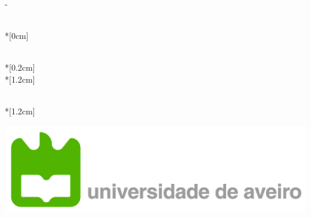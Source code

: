 \thispagestyle{empty}
\calccentering{\unitlength}
\begin{adjustwidth*}{\unitlength}{-\unitlength}
    \begin{adjustwidth}{-0.5cm}{-0.5cm}
        \sffamily
        \begin{flushright}
            \thesistypeabbr{} \\*[0cm]
            \thesistype{}\\
        \end{flushright}
        \vspace*{\fill}
        \noindent
        \HUGE \thesistitle{}\\*[0.2cm]
        \Huge \thesissubtitle{}\\*[1.2cm]
        \parbox[b]{0.5\linewidth}{
            \LARGE 
            \thesisauthor{}\\*[1.2cm]
            \Large
            \thesislocation{} \the\year
        }
        \hfill\includegraphics[scale=0.4]{images/ua.png}
    \end{adjustwidth}
\end{adjustwidth*}
\normalfont
\normalsize
